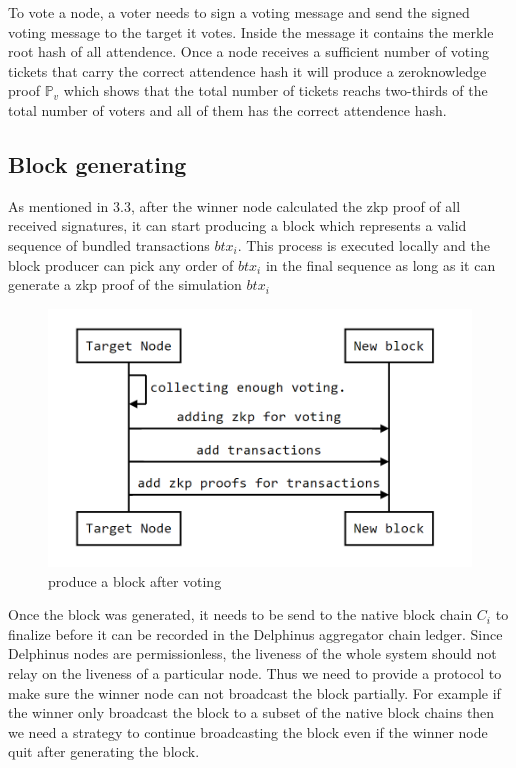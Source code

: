 \documentclass[pageno]{jpaper}
\begin{document}
To vote a node, a voter needs to sign a voting message and send the signed voting message to the target it votes. Inside the message it contains the merkle root hash of all attendence. Once a node receives a sufficient number of voting tickets that carry the correct attendence hash it will produce a zeroknowledge proof $\mathbb{P}_v$ which shows that the total number of tickets reachs two-thirds of the total number of voters and all of them has the correct attendence hash. 

\subsection{Block generating}
As mentioned in 3.3, after the winner node calculated the zkp proof of all received signatures, it can start producing a block which represents a valid sequence of bundled transactions $btx_i$. This process is executed locally and the block producer can pick any order of $btx_i$ in the final sequence as long as it can generate a zkp proof of the simulation $btx_i$

\begin{figure}[!ht]
\begin{center}
\includegraphics[scale=0.4]{produce-block.png}
\end{center}
\caption{produce a block after voting}
\label{produce-block}
\end{figure}

Once the block was generated, it needs to be send to the native block chain $C_i$ to finalize before it can be recorded in the Delphinus aggregator chain ledger. Since Delphinus nodes are permissionless, the liveness of the whole system should not relay on the liveness of a particular node. Thus we need to provide a protocol to make sure the winner node can not broadcast the block partially. For example if the winner only broadcast the block to a subset of the native block chains then we need a strategy to continue broadcasting the block even if the winner node quit after generating the block.
\end{document}
